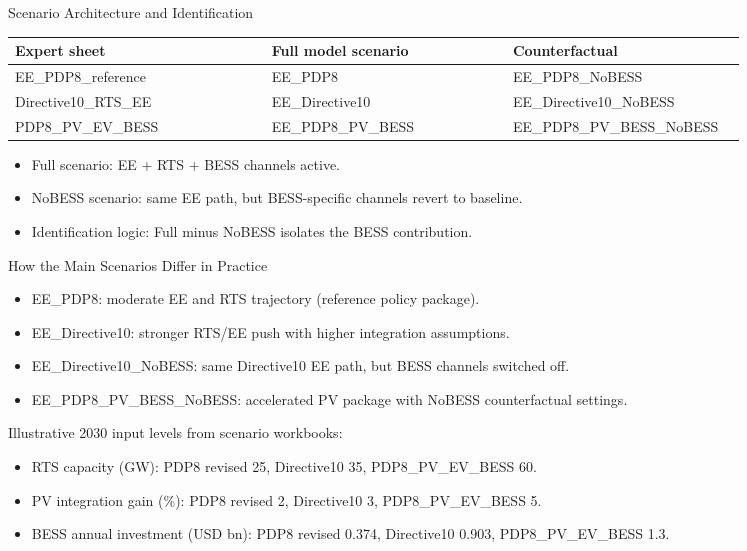 \documentclass[aspectratio=169]{beamer}
\begin{document}
\begin{frame}{Scenario Architecture and Identification}
\small
\begin{tabular}{>{\raggedright\arraybackslash}p{0.33\linewidth}>{\raggedright\arraybackslash}p{0.31\linewidth}>{\raggedright\arraybackslash}p{0.30\linewidth}}
\toprule
Expert sheet & Full model scenario & Counterfactual \\
\midrule
EE\_PDP8\_reference & EE\_PDP8 & EE\_PDP8\_NoBESS \\
Directive10\_RTS\_EE & EE\_Directive10 & EE\_Directive10\_NoBESS \\
PDP8\_PV\_EV\_BESS & EE\_PDP8\_PV\_BESS & EE\_PDP8\_PV\_BESS\_NoBESS \\
\bottomrule
\end{tabular}

\vspace{0.5em}
\begin{itemize}
  \item Full scenario: EE + RTS + BESS channels active.
  \item NoBESS scenario: same EE path, but BESS-specific channels revert to baseline.
  \item Identification logic: Full minus NoBESS isolates the BESS contribution.
\end{itemize}
\end{frame}

\begin{frame}{How the Main Scenarios Differ in Practice}
\small
\begin{itemize}
  \item EE\_PDP8: moderate EE and RTS trajectory (reference policy package).
  \item EE\_Directive10: stronger RTS/EE push with higher integration assumptions.
  \item EE\_Directive10\_NoBESS: same Directive10 EE path, but BESS channels switched off.
  \item EE\_PDP8\_PV\_BESS\_NoBESS: accelerated PV package with NoBESS counterfactual settings.
\end{itemize}

\vspace{0.4em}
\footnotesize
Illustrative 2030 input levels from scenario workbooks:
\begin{itemize}
  \item RTS capacity (GW): PDP8 revised 25, Directive10 35, PDP8\_PV\_EV\_BESS 60.
  \item PV integration gain (\%): PDP8 revised 2, Directive10 3, PDP8\_PV\_EV\_BESS 5.
  \item BESS annual investment (USD bn): PDP8 revised 0.374, Directive10 0.903, PDP8\_PV\_EV\_BESS 1.3.
\end{itemize}
\end{frame}
\end{document}
